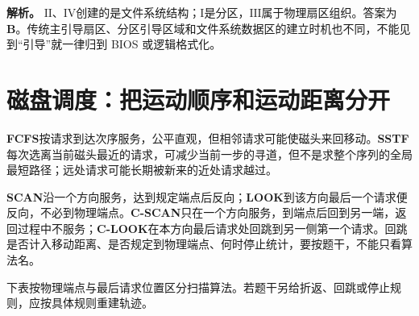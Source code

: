 \textbf{解析。} \ensuremath{\mathrm{II}}、\ensuremath{\mathrm{IV}}创建的是文件系统结构；\ensuremath{\mathrm{I}}是分区，\ensuremath{\mathrm{III}}属于物理扇区组织。答案为 \textbf{B}。传统主引导扇区、分区引导区域和文件系统数据区的建立时机也不同，不能见到``引导''就一律归到 BIOS 或逻辑格式化。

\section{磁盘调度：把运动顺序和运动距离分开}\label{OS05-7-9}

\textbf{FCFS}按请求到达次序服务，公平直观，但相邻请求可能使磁头来回移动。\textbf{SSTF}每次选离当前磁头最近的请求，可减少当前一步的寻道，但不是求整个序列的全局最短路径；远处请求可能长期被新来的近处请求越过。

\textbf{SCAN}沿一个方向服务，达到规定端点后反向；\textbf{LOOK}到该方向最后一个请求便反向，不必到物理端点。\textbf{C-SCAN}只在一个方向服务，到端点后回到另一端，返回过程中不服务；\textbf{C-LOOK}在本方向最后请求处回跳到另一侧第一个请求。回跳是否计入移动距离、是否规定到物理端点、何时停止统计，要按题干，不能只看算法名。

下表按物理端点与最后请求位置区分扫描算法。若题干另给折返、回跳或停止规则，应按具体规则重建轨迹。

